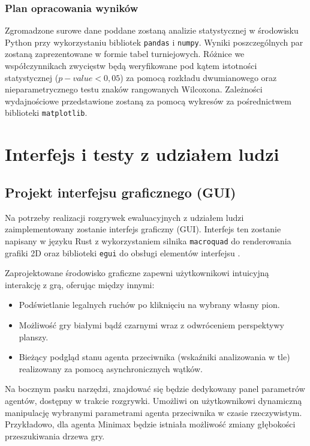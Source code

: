 \documentclass{article}
\begin{document}
\subsubsection{Plan opracowania wyników}
Zgromadzone surowe dane poddane zostaną analizie statystycznej w środowisku Python przy wykorzystaniu bibliotek \texttt{pandas} i \texttt{numpy}. Wyniki poszczególnych par zostaną zaprezentowane w formie tabel turniejowych. Różnice we współczynnikach zwycięstw będą weryfikowane pod kątem istotności statystycznej ($p-value < 0,05$) za pomocą rozkładu dwumianowego oraz nieparametrycznego testu znaków rangowanych Wilcoxona. Zależności wydajnościowe przedstawione zostaną za pomocą wykresów za pośrednictwem biblioteki \texttt{matplotlib}.

\newpage
\section{Interfejs i testy z udziałem ludzi}

\subsection{Projekt interfejsu graficznego (GUI)}

Na potrzeby realizacji rozgrywek ewaluacyjnych z udziałem ludzi zaimplementowany zostanie interfejs graficzny (GUI). Interfejs ten zostanie napisany w języku Rust z wykorzystaniem silnika \texttt{macroquad} do renderowania grafiki 2D oraz biblioteki \texttt{egui} do obsługi elementów interfejsu \cite{rust_lang}.

Zaprojektowane środowisko graficzne zapewni użytkownikowi intuicyjną interakcję z grą, oferując między innymi:
\begin{itemize}
    \item Podświetlanie legalnych ruchów po kliknięciu na wybrany własny pion.
    \item Możliwość gry białymi bądź czarnymi wraz z odwróceniem perspektywy planszy.
    \item Bieżący podgląd stanu agenta przeciwnika (wskaźniki analizowania w tle) realizowany za pomocą asynchronicznych wątków.
\end{itemize}

Na bocznym pasku narzędzi, znajdować się będzie dedykowany panel parametrów agentów, dostępny w trakcie rozgrywki. Umożliwi on użytkownikowi dynamiczną manipulację wybranymi parametrami agenta przeciwnika w czasie rzeczywistym. Przykładowo, dla agenta Minimax będzie istniała możliwość zmiany głębokości przeszukiwania drzewa gry.
\end{document}
